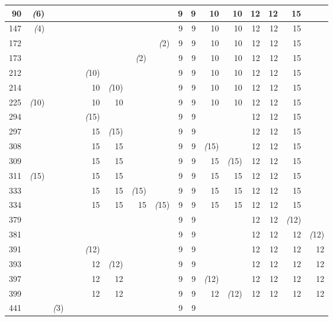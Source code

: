 \begin{table}[htbp]
\begin{tabular}{r||r|r|r|r|r|r|r|r|r|r|r|r|r|r|r}
\hline
90  & \emph(6) & ~ & ~ & ~ & ~ & ~ & ~ & 9 & 9 & 10 & 10 & 12 & 12 & 15 & ~ \\
\hline
147  & \emph(4) & ~ & ~ & ~ & ~ & ~ & ~ & 9 & 9 & 10 & 10 & 12 & 12 & 15 & ~ \\
\hline
172  & ~ & ~ & ~ & ~ & ~ & ~ & \emph(2) & 9 & 9 & 10 & 10 & 12 & 12 & 15 & ~ \\
\hline
173  & ~ & ~ & ~ & ~ & ~ & \emph(2) & ~ & 9 & 9 & 10 & 10 & 12 & 12 & 15 & ~ \\
\hline
212  & ~ & ~ & ~ & \emph(10) & ~ & ~ & ~ & 9 & 9 & 10 & 10 & 12 & 12 & 15 & ~ \\
\hline
214  & ~ & ~ & ~ & 10 & \emph(10) & ~ & ~ & 9 & 9 & 10 & 10 & 12 & 12 & 15 & ~ \\
\hline
225  & \emph(10) & ~ & ~ & 10 & 10 & ~ & ~ & 9 & 9 & 10 & 10 & 12 & 12 & 15 & ~ \\
\hline
294  & ~ & ~ & ~ & \emph(15) & ~ & ~ & ~ & 9 & 9 & ~ & ~ & 12 & 12 & 15 & ~ \\
\hline
297  & ~ & ~ & ~ & 15 & \emph(15) & ~ & ~ & 9 & 9 & ~ & ~ & 12 & 12 & 15 & ~ \\
\hline
308  & ~ & ~ & ~ & 15 & 15 & ~ & ~ & 9 & 9 & \emph(15) & ~ & 12 & 12 & 15 & ~ \\
\hline
309  & ~ & ~ & ~ & 15 & 15 & ~ & ~ & 9 & 9 & 15 & \emph(15) & 12 & 12 & 15 & ~ \\
\hline
311  & \emph(15) & ~ & ~ & 15 & 15 & ~ & ~ & 9 & 9 & 15 & 15 & 12 & 12 & 15 & ~ \\
\hline
333  & ~ & ~ & ~ & 15 & 15 & \emph(15) & ~ & 9 & 9 & 15 & 15 & 12 & 12 & 15 & ~ \\
\hline
334  & ~ & ~ & ~ & 15 & 15 & 15 & \emph(15) & 9 & 9 & 15 & 15 & 12 & 12 & 15 & ~ \\
\hline
379  & ~ & ~ & ~ & ~ & ~ & ~ & ~ & 9 & 9 & ~ & ~ & 12 & 12 & \emph(12) & ~ \\
\hline
381  & ~ & ~ & ~ & ~ & ~ & ~ & ~ & 9 & 9 & ~ & ~ & 12 & 12 & 12 & \emph(12) \\
\hline
391  & ~ & ~ & ~ & \emph(12) & ~ & ~ & ~ & 9 & 9 & ~ & ~ & 12 & 12 & 12 & 12 \\
\hline
393  & ~ & ~ & ~ & 12 & \emph(12) & ~ & ~ & 9 & 9 & ~ & ~ & 12 & 12 & 12 & 12 \\
\hline
397  & ~ & ~ & ~ & 12 & 12 & ~ & ~ & 9 & 9 & \emph(12) & ~ & 12 & 12 & 12 & 12 \\
\hline
399  & ~ & ~ & ~ & 12 & 12 & ~ & ~ & 9 & 9 & 12 & \emph(12) & 12 & 12 & 12 & 12 \\
\hline
441  & ~ & \emph(3) & ~ & ~ & ~ & ~ & ~ & 9 & 9 & ~ & ~ & ~ & ~ & ~ & ~ \\

\end{tabular}
\end{table}

